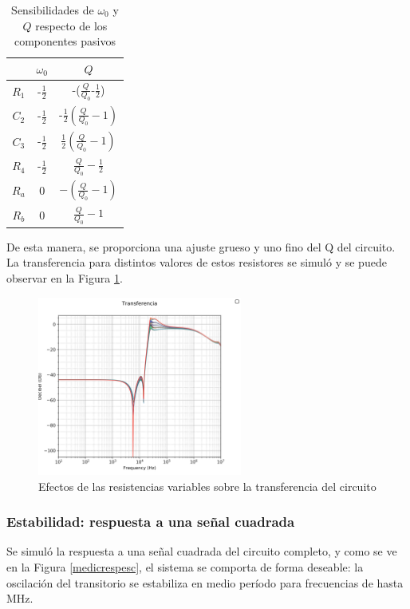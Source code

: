 \documentclass[spanish]{article}
\begin{document}
\begin{table}[H]
\begin{centering}
\begin{tabular}{|c|c|c|}
\hline 
 & $\omega_{0}$ & $Q$\tabularnewline
\hline 
$R_{1}$ & -$\frac{1}{2}$ & -($\frac{Q}{Q_{0}}$-$\frac{1}{2}$)\tabularnewline
\hline 
$C_{2}$ & -$\frac{1}{2}$ & -$\frac{1}{2}(\frac{Q}{Q_{0}}-1)$\tabularnewline
\hline 
$C_{3}$ & -$\frac{1}{2}$ & $\frac{1}{2}(\frac{Q}{Q_{0}}-1)$\tabularnewline
\hline 
$R_{4}$ & -$\frac{1}{2}$ & $\frac{Q}{Q_{0}}-\frac{1}{2}$\tabularnewline
\hline 
$R_{a}$ & 0 & $-(\frac{Q}{Q_{0}}-1)$\tabularnewline
\hline 
$R_{b}$ & 0 & $\frac{Q}{Q_{0}}-1$\tabularnewline
\hline 
\end{tabular}
\par\end{centering}
\label{sensibilidades}
\caption{Sensibilidades de $\omega_{0}$ y $Q$ respecto de los componentes
pasivos}
\end{table}

De esta manera, se proporciona una ajuste grueso y uno fino del Q del circuito. La transferencia para distintos valores de estos resistores se simuló y se puede observar en la Figura \ref{ambospreset}.
\begin{figure}[H]
    \centering
    \includegraphics[width=0.6\textwidth]{Resources/ambospreset.png}
    \caption{Efectos de las resistencias variables sobre la transferencia del circuito}
    \label{ambospreset}
\end{figure}

\subsubsection{Estabilidad: respuesta a una señal cuadrada}
Se simuló la respuesta a una señal cuadrada del circuito completo, y como se ve en la Figura \ref{medicrespesc}, el sistema se comporta de forma deseable: la oscilación del transitorio se estabiliza en medio período para frecuencias de hasta MHz.
\end{document}
